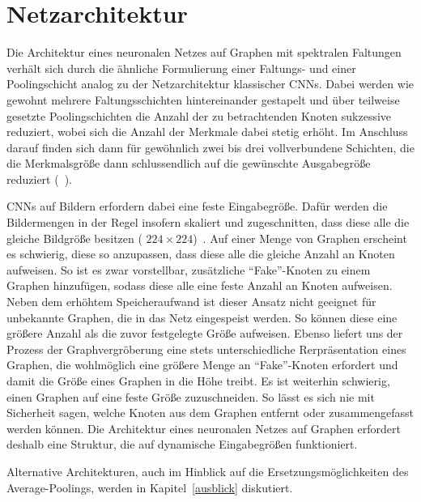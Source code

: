 \section{Netzarchitektur}
\label{spektrale_netzarchitektur}

Die Architektur eines neuronalen Netzes auf Graphen mit spektralen Faltungen verhält sich durch die ähnliche Formulierung einer Faltungs- und einer Poo\-ling\-sch\-icht analog zu der Netzarchitektur klassischer \glspl{CNN}.
Dabei werden wie gewohnt mehrere Faltungsschichten hintereinander gestapelt und über teilweise gesetzte Poolingschichten die Anzahl der zu betrachtenden Knoten sukzessive reduziert, wobei sich die Anzahl der Merkmale dabei stetig erhöht.
Im Anschluss darauf finden sich dann für gewöhnlich zwei bis drei vollverbundene Schichten, die die Merkmalsgröße dann schlussendlich auf die gewünschte Ausgabegröße reduziert (\vgl{}~\cite{Nielsen}).

\glspl{CNN} auf Bildern erfordern dabei eine feste Eingabegröße.
Dafür werden die Bildermengen in der Regel insofern skaliert und zugeschnitten, dass diese alle die gleiche Bildgröße besitzen (\zB{} $224 \times 224$)~\cite{spp}.
Auf einer Menge von Graphen erscheint es schwierig, diese so anzupassen, dass diese alle die gleiche Anzahl an Knoten aufweisen.
So ist es zwar vorstellbar, zusätzliche \enquote{Fake}-Knoten zu einem Graphen hinzufügen, sodass diese alle eine feste Anzahl an Knoten aufweisen.
Neben dem erhöhtem Speicheraufwand ist dieser Ansatz nicht geeignet für unbekannte Graphen, die in das Netz eingespeist werden.
So können diese \evtl{} eine größere Anzahl als die zuvor festgelegte Größe aufweisen.
Ebenso liefert uns der Prozess der Graphvergröberung eine stets unterschiedliche Rerpräsentation eines Graphen, die wohlmöglich eine größere Menge an \enquote{Fake}-Knoten erfordert und damit die Größe eines Graphen in die Höhe treibt.
Es ist weiterhin schwierig, einen Graphen auf eine feste Größe zuzuschneiden.
So lässt es sich nie mit Sicherheit sagen, welche Knoten aus dem Graphen entfernt oder zusammengefasst werden können.
Die Architektur eines neuronalen Netzes auf Graphen erfordert deshalb eine Struktur, die auf dynamische Eingabegrößen funktioniert.

Alternative Architekturen, auch im Hinblick auf die Ersetzungsmöglichkeiten \bzgl{} des Average-Poolings, werden in Kapitel~\ref{ausblick} diskutiert.
